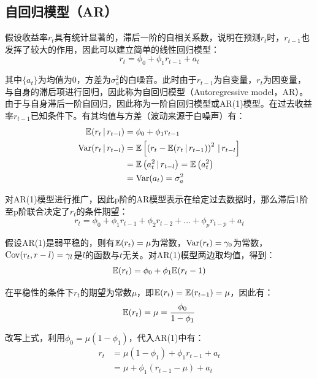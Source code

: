 \documentclass[11pt]{article}
\begin{document}
\subsection{自回归模型（AR）}

假设收益率$r_t$具有统计显著的，滞后一阶的自相关系数，说明在预测$r_t$时，$r_{t-1}$也发挥了较大的作用，因此可以建立简单的线性回归模型：
\begin{equation*}
    r_t = \phi_0 + \phi_1 r_{t-1} + a_t
\end{equation*}

其中$\{a_t\}$为均值为0，方差为$\sigma_{a}^2$的白噪音。此时由于$r_{t-1}$为自变量，$r_t$为因变量，与自身的滞后项进行回归，因此称为自回归模型（Autoregressive model，AR）。由于与自身滞后一阶自回归，因此称为一阶自回归模型或AR(1)模型。在过去收益率$r_{t-1}$已知条件下。有其均值与方差（波动来源于白噪声）有：
\begin{align*}
    \mathbb{E}(r_t \,\vert\, r_{t-l}) &= \phi_0 + \phi_1 r_{t-1} \\
    \operatorname{Var}(r_t \,\vert\, r_{t-l}) &= \mathbb{E}\left[\left(r_t - \mathbb{E}(r_t \,\vert\, r_{t-1}) \right)^2 \,\vert\, r_{t-l} \right] \\
    &= \mathbb{E} \left(a_t^2 \,\vert\, r_{t-l} \right) = \mathbb{E} \left(a_t^2\right) \\
    &= \operatorname{Var}(a_t) = \sigma_{a}^{2}
\end{align*}

对AR(1)模型进行推广，因此p阶的AR模型表示在给定过去数据时，那么滞后1阶至p阶联合决定了$r_t$的条件期望：
\begin{equation*}
    r_t = \phi_0 + \phi_1 r_{t-1} +  \phi_2 r_{t-2} + \dots +  \phi_p r_{t-p}  + a_t
\end{equation*}

假设AR(1)是弱平稳的，则有$\mathbb{E}(r_t)=\mu$为常数，$\operatorname{Var}(r_t)=\gamma_0$为常数，$\operatorname{Cov}(r_t,r-l) = \gamma_l$是$l$的函数与$t$无关。对AR(1)模型两边取均值，得到：
\begin{equation*}
    \mathbb{E}(r_t) = \phi_0 + \phi_1 \mathbb{E}(r_t-1)
\end{equation*}

在平稳性的条件下$r_t$的期望为常数$\mu$，即$\mathbb{E}(r_t) = \mathbb{E}(r_{t-1}) = \mu$，因此有：
\begin{equation*}
    \mathbb{E}(r_t) = \mu = \frac{\phi_0}{1-\phi_1}
\end{equation*}

改写上式，利用$\phi_0 = \mu(1-\phi_1)$，代入AR(1)中有：
\begin{align*}
    r_t &= \mu(1-\phi_1) + \phi_1 r_{t-1} + a_t \\
    &= \mu + \phi_1 (r_{t-1}-\mu)+ a_t 
\end{align*}
\end{document}
